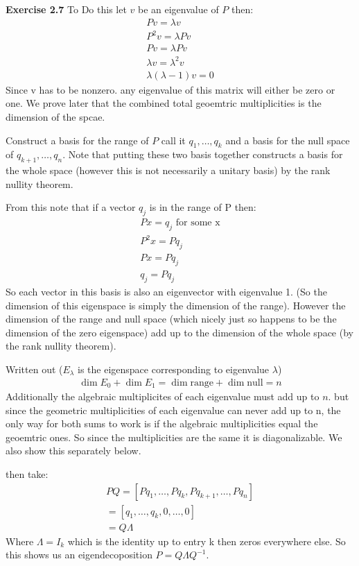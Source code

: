 \documentclass[12pt]{article}
\newenvironment{exercise}[1]{\vspace{.1in}\noindent\textbf{Exercise #1 \hspace{.05em}}}{}
\begin{document}
\begin{exercise}{2.7}
	To Do this let $v$ be an eigenvalue of $P$ then:
	\begin{align}
		Pv=\lambda v         \\
		P^2v = \lambda Pv    \\
		Pv=\lambda Pv        \\
		\lambda v=\lambda^2v \\
		\lambda(\lambda-1)v=0
	\end{align}
	Since v has to be nonzero. any eigenvalue of this matrix will either be zero or one. We prove later that the combined total geoemtric multiplicities is the dimension of the spcae.

	Construct a basis for the range of $P$ call it $q_1,\dots, q_k$ and a basis for the null space of $q_{k+1},\dots,q_n$. Note that putting these two basis together constructs a basis for the whole space (however this is not necessarily a unitary basis) by the rank nullity theorem.

	From this note that if a vector $q_j$ is in the range of P then:
	\begin{align}
		Px=q_j \text{ for some x} \\
		P^2x=Pq_j                 \\
		Px=Pq_j                   \\
		q_j=Pq_j
	\end{align}
	So each vector in this basis is also an eigenvector with eigenvalue 1. (So the dimension of this eigenspace is simply the dimension of the range). However the dimension of the range and null space (which nicely just so happens to be the dimension of the zero eigenspace) add up to the dimension of the whole space (by the rank nullity theorem).

	Written out ($E_\lambda$ is the eigenspace corresponding to eigenvalue $\lambda$)
	\begin{align}
		\dim E_0+\dim E_1=\dim \text{range} +\dim \text{null}=n
	\end{align}
	Additionally the algebraic multiplicites of each eigenvalue must add up to $n$. but since the geometric multiplicities of each eigenvalue can never add up to n, the only way for both sums to work is if the algebraic multiplicities equal the geoemtric ones. So since the multiplicities are the same it is diagonalizable. We also show this separately below.

	then take:
	\begin{align}
		PQ=[Pq_1,\dots,Pq_k,Pq_{k+1},\dots, Pq_n] \\
		=[q_1,\dots,q_k,0,\dots,0]                \\
		=Q\Lambda
	\end{align}
	Where $\Lambda = I_k$ which is the identity up to entry k then zeros everywhere else. So this shows us an eigendecoposition $P=Q\Lambda Q^{-1}$.


\end{exercise}
\end{document}
